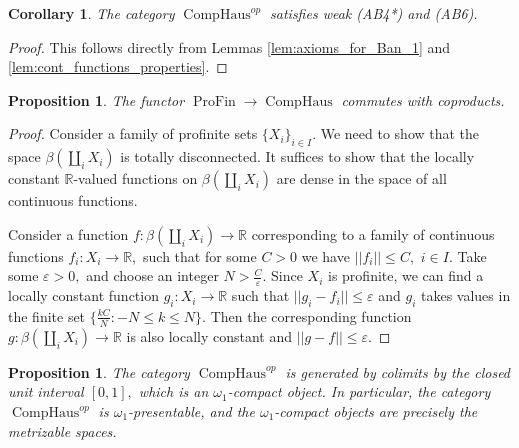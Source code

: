 \documentclass[11pt,leqno]{amsart}
\newtheorem{prop}[theo]{Proposition}
\newtheorem{cor}[theo]{Corollary}
\numberwithin{equation}{section}
\def\R{\mathbb{R}}
\newcommand{\profin}{\operatorname{ProFin}}
\newcommand{\comphaus}{\operatorname{CompHaus}}
\newcommand{\veps}{\varepsilon}
\begin{document}
\begin{cor} The category $\comphaus^{op}$ satisfies weak (AB4*) and (AB6).\end{cor}

\begin{proof} This follows directly from Lemmas \ref{lem:axioms_for_Ban_1} and \ref{lem:cont_functions_properties}. 
\end{proof} 

\begin{prop}The functor $\profin\to\comphaus$ commutes with coproducts.\end{prop}

\begin{proof}Consider a family of profinite sets $\{X_i\}_{i\in I}.$ We need to show that the space $\beta(\coprod_i X_i)$ is totally disconnected. It suffices to show that the locally constant $\R$-valued functions on $\beta(\coprod_i X_i)$ are dense in the space of all continuous functions.

Consider a function $f:\beta(\coprod_i X_i)\to\R$ corresponding to a family of continuous functions $f_i:X_i\to\R,$ such that for some $C>0$ we have $||f_i||\leq C,$ $i\in I.$ Take some $\veps>0,$ and choose an integer $N>\frac{C}{\veps}.$ Since $X_i$ is profinite, we can find a locally constant function $g_i:X_i\to\R$ such that $||g_i-f_i||\leq \veps$ and $g_i$ takes values in the finite set $\{\frac{kC}{N}: -N\leq k\leq N\}.$ Then the corresponding function $g:\beta(\coprod_i X_i)\to\R$ is also locally constant and $||g-f||\leq\veps.$\end{proof}

\begin{prop}\label{prop:comphaus_op_presentability} The category $\comphaus^{op}$ is generated by colimits by the closed unit interval $[0,1],$ which is an $\omega_1$-compact object. In particular, the category $\comphaus^{op}$ is $\omega_1$-presentable, and the $\omega_1$-compact objects are precisely the metrizable spaces.\end{prop}
\end{document}
